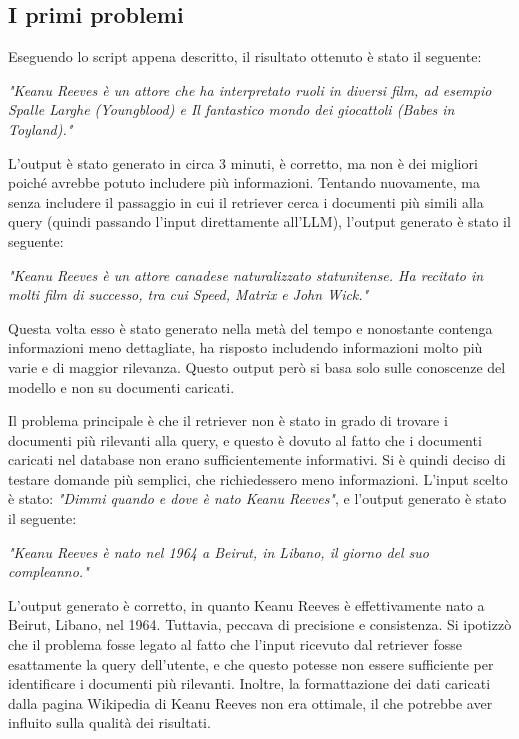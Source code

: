 \subsection{I primi problemi}
Eseguendo lo script appena descritto, il risultato ottenuto è stato il seguente:
\begin{center}
    \textit{"Keanu Reeves è un attore che ha interpretato ruoli in diversi film, ad esempio Spalle Larghe (Youngblood) e Il fantastico mondo dei giocattoli (Babes in Toyland)."}
\end{center}
L'output è stato generato in circa 3 minuti, è corretto, ma non è dei migliori poiché avrebbe potuto includere più informazioni. Tentando nuovamente, ma senza includere il passaggio in cui il retriever cerca i documenti più simili alla query (quindi passando l'input direttamente all'LLM), l'output generato è stato il seguente:
\begin{center}
    \textit{"Keanu Reeves è un attore canadese naturalizzato statunitense. Ha recitato in molti film di successo, tra cui Speed, Matrix e John Wick."}
\end{center}
Questa volta esso è stato generato nella metà del tempo e nonostante contenga informazioni meno dettagliate, ha risposto includendo informazioni molto più varie e di maggior rilevanza. Questo output però si basa solo sulle conoscenze del modello e non su documenti caricati.

Il problema principale è che il retriever non è stato in grado di trovare i documenti più rilevanti alla query, e questo è dovuto al fatto che i documenti caricati nel database non erano sufficientemente informativi. Si è quindi deciso di testare domande più semplici, che richiedessero meno informazioni. L'input scelto è stato: \textit{"Dimmi quando e dove è nato Keanu Reeves"}, e l'output generato è stato il seguente:
\begin{center}
    \textit{"Keanu Reeves è nato nel 1964 a Beirut, in Libano, il giorno del suo compleanno."}
\end{center}
L'output generato è corretto, in quanto Keanu Reeves è effettivamente nato a Beirut, Libano, nel 1964. Tuttavia, peccava di precisione e consistenza. Si ipotizzò che il problema fosse legato al fatto che l'input ricevuto dal retriever fosse esattamente la query dell'utente, e che questo potesse non essere sufficiente per identificare i documenti più rilevanti. Inoltre, la formattazione dei dati caricati dalla pagina Wikipedia di Keanu Reeves non era ottimale, il che potrebbe aver influito sulla qualità dei risultati.

